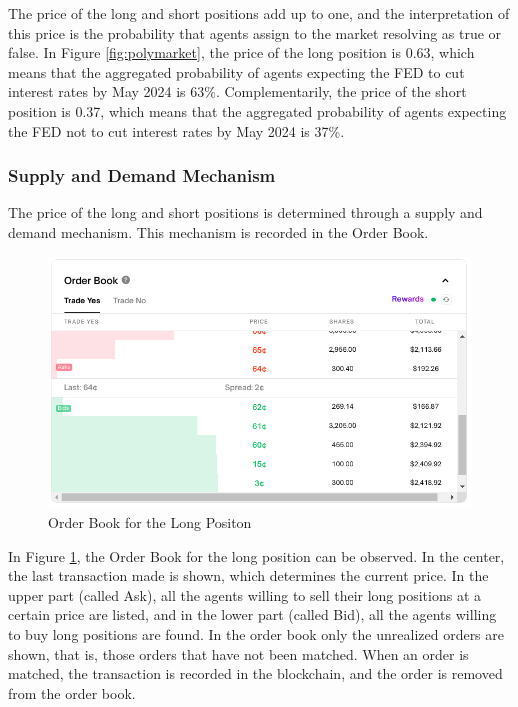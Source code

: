 The price of the long and short positions add up to one, and the interpretation of this price is the probability that agents assign to the market resolving as true or false. In Figure \ref{fig:polymarket}, the price of the long position is 0.63, which means that the aggregated probability of agents expecting the FED to cut interest rates by May 2024 is 63\%. Complementarily, the price of the short position is 0.37, which means that the aggregated probability of agents expecting the FED not to cut interest rates by May 2024 is 37\%.

\subsubsection{Supply and Demand Mechanism}
\label{subsubsec:supply_and_demand_mechanism}

The price of the long and short positions is determined through a supply and demand mechanism. This mechanism is recorded in the Order Book.

\begin{figure}[htbp]
    \centering
    \includegraphics[scale=0.4]{img/order_book_yes.png}
    \caption{Order Book for the Long Positon}
    \label{fig:order_book_yes}
\end{figure}

In Figure \ref{fig:order_book_yes}, the Order Book for the long position can be observed. In the center, the last transaction made is shown, which determines the current price. In the upper part (called Ask), all the agents willing to sell their long positions at a certain price are listed, and in the lower part (called Bid), all the agents willing to buy long positions are found. In the order book only the unrealized orders are shown, that is, those orders that have not been matched. When an order is matched, the transaction is recorded in the blockchain, and the order is removed from the order book.
 
